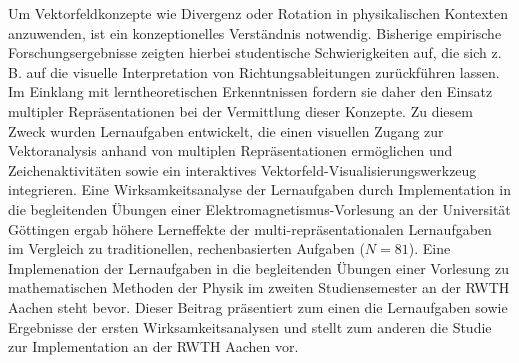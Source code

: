 \documentclass{scdpg}
\begin{document}
\begin{scAbstract}
{}
\scBeginText
Um Vektorfeldkonzepte wie Divergenz oder Rotation in physikalischen Kontexten anzuwenden, ist ein konzeptionelles Verständnis notwendig. Bisherige empirische Forschungsergebnisse zeigten hierbei studentische Schwierigkeiten auf, die sich z. B. auf die visuelle Interpretation von Richtungsableitungen zurückführen lassen. Im Einklang mit lerntheoretischen Erkenntnissen fordern sie daher den Einsatz multipler Repräsentationen bei der Vermittlung dieser Konzepte. Zu diesem Zweck wurden Lernaufgaben entwickelt, die einen visuellen Zugang zur Vektoranalysis anhand von multiplen Repräsentationen ermöglichen und Zeichenaktivitäten sowie ein interaktives Vektorfeld-Visualisierungswerkzeug integrieren. Eine Wirksamkeitsanalyse der Lernaufgaben durch Implementation in die begleitenden Übungen einer Elektromagnetismus-Vorlesung an der Universität Göttingen ergab höhere Lerneffekte der multi-repräsentationalen Lernaufgaben im Vergleich zu traditionellen, rechenbasierten Aufgaben ($N=81$). Eine Implemenation der Lernaufgaben in die begleitenden Übungen einer Vorlesung zu mathematischen Methoden der Physik im zweiten Studiensemester an der RWTH Aachen steht bevor. Dieser Beitrag präsentiert zum einen die Lernaufgaben sowie Ergebnisse der ersten Wirksamkeitsanalysen und stellt zum anderen die Studie zur Implementation an der RWTH Aachen vor.
\scEndText
{}
\end{scAbstract}
\end{document}

